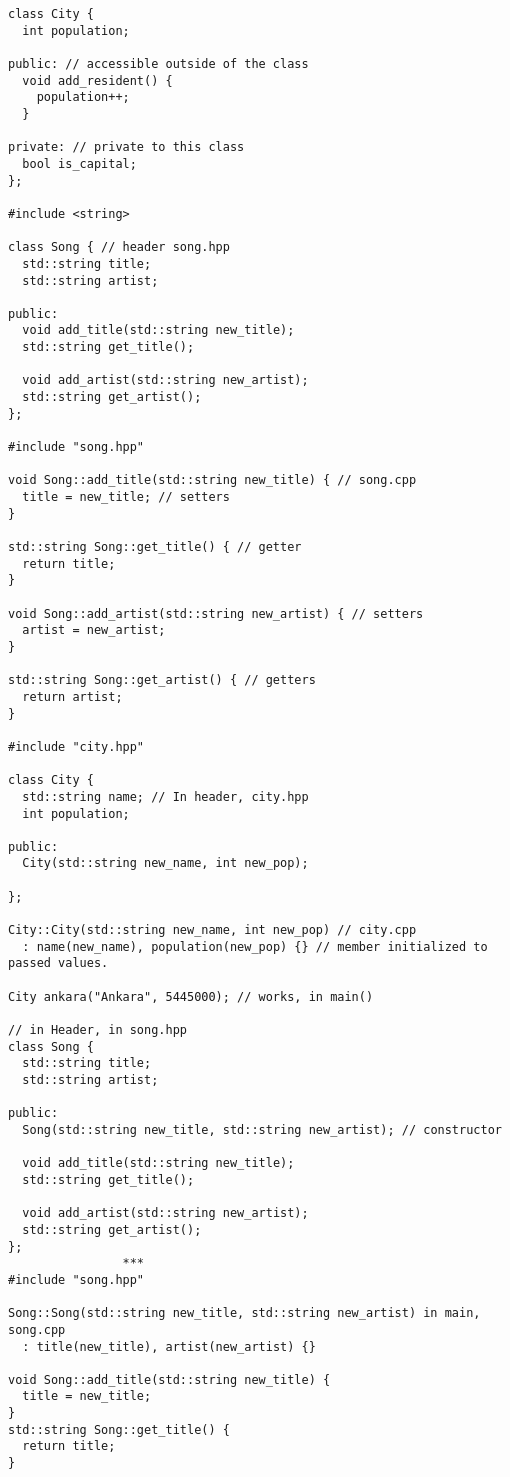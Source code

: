 \documentclass[openany]{report}
\begin{document}
\begin{verbatim}
class City {
  int population; 
 
public: // accessible outside of the class
  void add_resident() { 
    population++;
  }

private: // private to this class
  bool is_capital;
};

#include <string>

class Song { // header song.hpp
  std::string title;
  std::string artist;

public:
  void add_title(std::string new_title);
  std::string get_title();
  
  void add_artist(std::string new_artist);
  std::string get_artist();
};

#include "song.hpp"

void Song::add_title(std::string new_title) { // song.cpp
  title = new_title; // setters
}

std::string Song::get_title() { // getter
  return title;
}

void Song::add_artist(std::string new_artist) { // setters
  artist = new_artist;
}

std::string Song::get_artist() { // getters
  return artist;
}

#include "city.hpp"
 
class City {
  std::string name; // In header, city.hpp
  int population;
 
public:
  City(std::string new_name, int new_pop);
 
};
 
City::City(std::string new_name, int new_pop) // city.cpp
  : name(new_name), population(new_pop) {} // member initialized to passed values.

City ankara("Ankara", 5445000); // works, in main()

// in Header, in song.hpp
class Song {
  std::string title;
  std::string artist;

public:
  Song(std::string new_title, std::string new_artist); // constructor

  void add_title(std::string new_title);
  std::string get_title();

  void add_artist(std::string new_artist);
  std::string get_artist();
};
                ***
#include "song.hpp"

Song::Song(std::string new_title, std::string new_artist) in main, song.cpp
  : title(new_title), artist(new_artist) {}

void Song::add_title(std::string new_title) {
  title = new_title;
}
std::string Song::get_title() {
  return title;
}


\end{verbatim}
\end{document}

